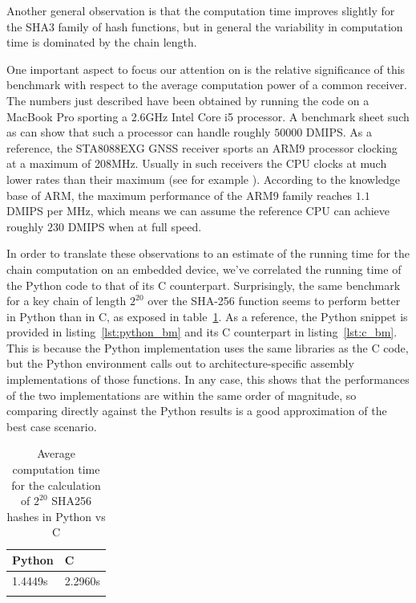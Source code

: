 Another general observation is that the computation time improves slightly for
the SHA3 family of hash functions, but in general the variability in computation
time is dominated by the chain length.

One important aspect to focus our attention on is the relative significance of
this benchmark with respect to the average computation power of a common 
receiver. The numbers just described have been obtained by running the code on a
MacBook Pro sporting a 2.6GHz Intel Core i5 processor. A benchmark sheet such as
\cite{bm_intel_core_i5} can show that such a processor can handle roughly $50
000$ DMIPS. As a reference, the STA8088EXG GNSS receiver \cite{st_rec_specs}
sports an ARM9 processor clocking at a maximum of 208MHz. Usually in such
receivers the CPU clocks at much lower rates than their maximum (see for example
\cite{mediatek_specs}). According to the knowledge base of ARM, the maximum
performance of the ARM9 family reaches $1.1$ DMIPS per MHz, which means we can
assume the reference CPU can achieve roughly $230$ DMIPS when at full speed.

In order to translate these observations to an estimate of the running time for the
chain computation on an embedded device, we've correlated the running time of
the Python code to that of its C counterpart. Surprisingly, the same benchmark
for a key chain of length $2^{20}$ over the SHA-256 function seems to perform
better in Python than in C, as exposed in table~\ref{table:bm_c_python}. As a
reference, the Python snippet is provided in listing~\ref{lst:python_bm} and its
C counterpart in listing~\ref{lst:c_bm}. This is because the Python
implementation uses the same libraries as the C code, but the Python environment
calls out to architecture-specific assembly implementations of those functions.
In any case, this shows that the performances of the two implementations are
within the same order of magnitude, so comparing directly against the Python
results is a good approximation of the best case scenario.





\begin{longtable}[]{@{}ll@{}}
\toprule
Python & C\tabularnewline
\midrule
\endhead
1.4449s & 2.2960s\tabularnewline
\bottomrule
\caption{Average computation time for the calculation of $2^{20}$ SHA256 hashes
in Python vs C}
\label{table:bm_c_python}
\end{longtable}


